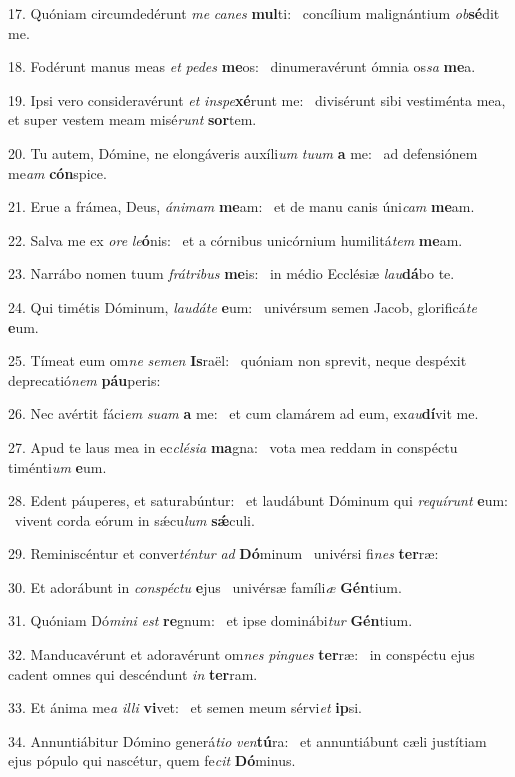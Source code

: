 17. Quóniam circumdedérunt \textit{me} \textit{ca}\textit{nes} \textbf{mul}ti: \ast\  concílium malignántium \textit{ob}\textbf{sé}dit me.\

18. Fodérunt manus meas \textit{et} \textit{pe}\textit{des} \textbf{me}os: \ast\  dinumeravérunt ómnia os\textit{sa} \textbf{me}a.\

19. Ipsi vero consideravérunt \textit{et} \textit{in}\textit{spe}\textbf{xé}runt me: \ast\  divisérunt sibi vestiménta mea, et super vestem meam misé\textit{runt} \textbf{sor}tem.\

20. Tu autem, Dómine, ne elongáveris auxíli\textit{um} \textit{tu}\textit{um} \textbf{a} me: \ast\  ad defensiónem me\textit{am} \textbf{cón}spice.\

21. Erue a frámea, Deus, \textit{á}\textit{ni}\textit{mam} \textbf{me}am: \ast\  et de manu canis úni\textit{cam} \textbf{me}am.\

22. Salva me ex \textit{o}\textit{re} \textit{le}\textbf{ó}nis: \ast\  et a córnibus unicórnium humilitá\textit{tem} \textbf{me}am.\

23. Narrábo nomen tuum \textit{frá}\textit{tri}\textit{bus} \textbf{me}is: \ast\  in médio Ecclésiæ \textit{lau}\textbf{dá}bo te.\

24. Qui timétis Dóminum, \textit{lau}\textit{dá}\textit{te} \textbf{e}um: \ast\  univérsum semen Jacob, glorificá\textit{te} \textbf{e}um.\

25. Tímeat eum om\textit{ne} \textit{se}\textit{men} \textbf{Is}raël: \ast\  quóniam non sprevit, neque despéxit deprecatió\textit{nem} \textbf{páu}peris:\

26. Nec avértit fáci\textit{em} \textit{su}\textit{am} \textbf{a} me: \ast\  et cum clamárem ad eum, ex\textit{au}\textbf{dí}vit me.\

27. Apud te laus mea in ec\textit{clé}\textit{si}\textit{a} \textbf{ma}gna: \ast\  vota mea reddam in conspéctu timénti\textit{um} \textbf{e}um.\

28. Edent páuperes, et saturabúntur: \dag\  et laudábunt Dóminum qui \textit{re}\textit{quí}\textit{runt} \textbf{e}um: \ast\  vivent corda eórum in sǽcu\textit{lum} \textbf{sǽ}culi.\

29. Reminiscéntur et conver\textit{tén}\textit{tur} \textit{ad} \textbf{Dó}minum \ast\  univérsi fi\textit{nes} \textbf{ter}ræ:\

30. Et adorábunt in \textit{con}\textit{spéc}\textit{tu} \textbf{e}jus \ast\  univérsæ famíli\textit{æ} \textbf{Gén}tium.\

31. Quóniam Dó\textit{mi}\textit{ni} \textit{est} \textbf{re}gnum: \ast\  et ipse dominábi\textit{tur} \textbf{Gén}tium.\

32. Manducavérunt et adoravérunt om\textit{nes} \textit{pin}\textit{gues} \textbf{ter}ræ: \ast\  in conspéctu ejus cadent omnes qui descéndunt \textit{in} \textbf{ter}ram.\

33. Et ánima me\textit{a} \textit{il}\textit{li} \textbf{vi}vet: \ast\  et semen meum sérvi\textit{et} \textbf{ip}si.\

34. Annuntiábitur Dómino generá\textit{ti}\textit{o} \textit{ven}\textbf{tú}ra: \ast\  et annuntiábunt cæli justítiam ejus pópulo qui nascétur, quem fe\textit{cit} \textbf{Dó}minus.\

